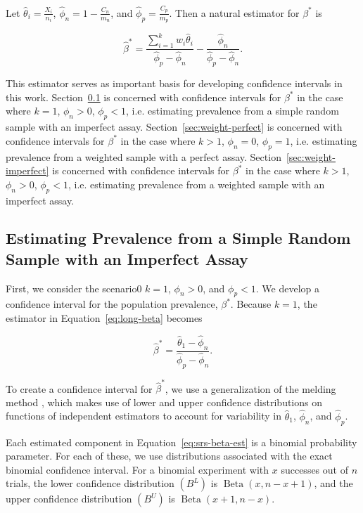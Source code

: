 \documentclass[AMA,STIX1COL]{WileyNJD-v2}
\begin{document}
Let \( \hat{\theta}_i = \frac{X_i}{n_i} \), \( \hat{\phi}_n = 1 - \frac{C_n}{m_n} \), and \( \hat{\phi}_p = \frac{C_p}{m_p} \).
Then a natural estimator for \( \beta^* \) is 

\begin{equation}
    \hat{\beta}^* = \frac{\sum_{i=1}^k w_i \hat{\theta}_i}{\hat{\phi}_p - \hat{\phi}_n} - \frac{\hat{\phi}_n}{\hat{\phi}_p - \hat{\phi}_n}.
\end{equation}

This estimator serves as important basis for developing confidence intervals in this work.
Section~\ref{sec:srs-imperfect} is concerned with confidence intervals for  \( \beta^* \) in the case where \( k = 1 \), \( \phi_n > 0 \), \( \phi_p < 1 \), i.e. estimating prevalence from a simple random sample with an imperfect assay.
Section~\ref{sec:weight-perfect} is concerned with confidence intervals for  \( \beta^* \) in the case where \( k > 1 \), \( \phi_n = 0 \), \( \phi_p = 1 \), i.e. estimating prevalence from a weighted sample with a perfect assay.
Section~\ref{sec:weight-imperfect} is concerned with confidence intervals for  \( \beta^* \) in the case where \( k > 1 \), \( \phi_n > 0 \), \( \phi_p < 1 \), i.e. estimating prevalence from a weighted sample with an imperfect assay.

\subsection{Estimating Prevalence from a Simple Random Sample with an Imperfect Assay}
\label{sec:srs-imperfect}

First, we consider the scenario0 \( k = 1 \), \( \phi_n > 0 \), and \( \phi_p < 1 \).
We develop a confidence interval for the population prevalence, \( \beta^* \).
Because \( k = 1 \), the estimator in Equation~\ref{eq:long-beta} becomes 

\begin{equation}
\hat{\beta}^* = \frac{\hat{\theta}_1 - \hat{\phi}_n}{\hat{\phi}_p - \hat{\phi}_n}.
\label{eq:srs-beta-est}
\end{equation}

To create a confidence interval for \( \hat{\beta}^* \), we use a generalization of the melding method \cite{FayP:2015}, which makes use of lower and upper confidence distributions on functions of independent estimators to account for variability in \( \hat{\theta}_1 \), \( \hat{\phi}_n \), and \( \hat{\phi}_p \).

Each estimated component in Equation~\ref{eq:srs-beta-est} is a binomial probability parameter.
For each of these, we use distributions associated with  the exact binomial confidence interval.
For a binomial experiment with \( x \) successes out of \( n \) trials, the lower confidence distribution \( (B^L) \) is \( \operatorname{Beta}(x, n - x + 1) \), and the upper confidence distribution \( (B^U) \) is \( \operatorname{Beta}(x + 1, n - x)\).
\end{document}
